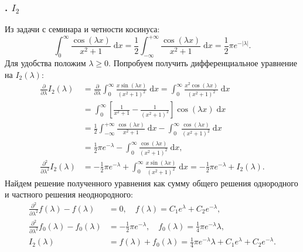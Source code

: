 \subsubsection*{. $I_2$}
Из задачи с семинара и четности косинуса:
\begin{equation*}
\int_{0}^{\infty} \frac{\cos{(\lambda x)}}{x^2+1}\; \mathrm{d} x = \frac{1}{2}\int_{-\infty}^{+\infty} \frac{\cos{(\lambda x)}}{x^2+1}\; \mathrm{d} x = \frac{1}{2}\pi e^{-|\lambda|}.
\end{equation*}
Для удобства положим $\lambda \ge 0$. Попробуем получить дифференциальное уравнение на $I_2(\lambda)$:
\begin{align*}
  \frac{\partial^{} }{\partial \lambda^{}} I_2(\lambda) &= \frac{\partial^{} }{\partial \lambda^{}} \int_{0}^{\infty} \frac{x\sin{(\lambda x)}}{ \left(x^2+1 \right)^2}\; \mathrm{d} x = \int_{0}^{\infty} \frac{x^2\cos{(\lambda x)}}{ \left(x^2+1 \right)^2}\; \mathrm{d} x\\
                              &= \int_{0}^{\infty} \left[\frac{1}{x^2+1} - \frac{1}{ \left(x^2+1 \right)^2} \right] \cos{(\lambda x)} \; \mathrm{d} x\\
                              &= \frac{1}{2} \int_{-\infty}^{+\infty} \frac{\cos{(\lambda x)}}{x^2 + 1}\; \mathrm{d} x - \int_{0}^{\infty} \frac{\cos{(\lambda x)}}{ \left(x^2+1 \right)^2}\; \mathrm{d} x\\
                              &= \frac{1}{2}\pi e^{-\lambda} - \int_{0}^{\infty} \frac{\cos{(\lambda x)}}{ \left(x^2+1 \right)^2}\; \mathrm{d} x,\\
  \frac{\partial^{2} }{\partial \lambda^{2}} I_2(\lambda) &= -\frac{1}{2}\pi e^{-\lambda} + \int_{0}^{\infty} \frac{x\sin{(\lambda x)}}{ \left(x^2+1 \right)^2}\; \mathrm{d} x = -\frac{1}{2}\pi e^{-\lambda} + I_2(\lambda).
\end{align*}
Найдем решение полученного уравнения как сумму общего решения однородного и частного решения неоднородного:
\begin{align*}
  \frac{\partial^{2} }{\partial \lambda^{2}} f(\lambda) - f(\lambda) &= 0,\quad f(\lambda) = C_1e^{\lambda} + C_2e^{-\lambda},\\
  \frac{\partial^{2} }{\partial \lambda^{2}} f_0(\lambda) - f_0(\lambda) &= -\frac{1}{2}\pi e^{-\lambda},\quad f_0(\lambda) = \frac{1}{4}\pi e^{-\lambda}\lambda,\\
  I_2(\lambda) &= f(\lambda) + f_0(\lambda) = \frac{1}{4}\pi e^{-\lambda}\lambda + C_1e^{\lambda} + C_2e^{-\lambda}.
\end{align*}
